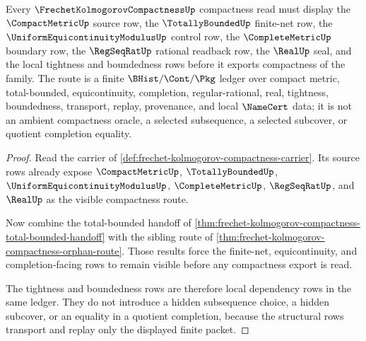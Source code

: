 \begin{theorem}
\label{thm:frechet-kolmogorov-tightness-route}
Every $\FrechetKolmogorovCompactnessUp$ compactness read must display the $\CompactMetricUp$ source row, the $\TotallyBoundedUp$ finite-net row, the $\UniformEquicontinuityModulusUp$ control row, the $\CompleteMetricUp$ boundary row, the $\RegSeqRatUp$ rational readback row, the $\RealUp$ seal, and the local tightness and boundedness rows before it exports compactness of the family. The route is a finite $\BHist/\Cont/\Pkg$ ledger over compact metric, total-bounded, equicontinuity, completion, regular-rational, real, tightness, boundedness, transport, replay, provenance, and local $\NameCert$ data; it is not an ambient compactness oracle, a selected subsequence, a selected subcover, or quotient completion equality.
\end{theorem}
\begin{proof}
Read the carrier of \autoref{def:frechet-kolmogorov-compactness-carrier}. Its source rows already expose $\CompactMetricUp$, $\TotallyBoundedUp$, $\UniformEquicontinuityModulusUp$, $\CompleteMetricUp$, $\RegSeqRatUp$, and $\RealUp$ as the visible compactness route.

Now combine the total-bounded handoff of \autoref{thm:frechet-kolmogorov-compactness-total-bounded-handoff} with the sibling route of \autoref{thm:frechet-kolmogorov-compactness-orphan-route}. Those results force the finite-net, equicontinuity, and completion-facing rows to remain visible before any compactness export is read.

The tightness and boundedness rows are therefore local dependency rows in the same ledger. They do not introduce a hidden subsequence choice, a hidden subcover, or an equality in a quotient completion, because the structural rows transport and replay only the displayed finite packet.
\end{proof}
